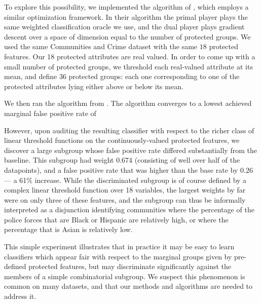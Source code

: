 To explore this possibility,
we implemented the algorithm of \cite{reductions}, which employs a
similar optimization framework. In their algorithm the primal player
plays the same weighted classification oracle we use, and the dual
player plays gradient descent over a space of dimension equal to the number of protected groups.
We used the same Communities and Crime dataset with the same $18$ protected features.
Our 18 protected attributes are real valued. In order to come up with a
small number of protected groups, we threshold each real-valued
attribute at its mean, and define 36 protected groups: each one corresponding
to one of the protected attributes lying either above or below its mean.

We then ran the algorithm from  \cite{reductions}.
The algorithm converges to a lowest achieved marginal false positive 
rate of

However, upon auditing the resulting classifier with respect to the richer
class of linear threshold functions on the continuously-valued
protected features, we discover a large subgroup whose false positive
rate differed substantially from the baseline. This subgroup had
weight $0.674$ (consisting of well over half of the datapoints),
and a false positive rate that was higher than the base rate by $0.26$ --- a 61\% increase.
While the discriminated subgroup is of course defined by a complex linear threshold function over 18 variables,
the largest weights by far were on only three of these features, and the subgroup can thus be informally
interpreted as a disjunction identifying communities where the percentage of the police forces
that are Black or Hispanic are relatively high, or where the percentage that is Asian is relatively low.

This simple experiment illustrates that in practice it may be easy
to learn classifiers which appear fair with respect to the
marginal groups given by pre-defined protected features, but may
discriminate significantly against the members of a simple combinatorial subgroup.
We suspect this phenomenon is common on many datasets, and that our methods and algorithms are needed
to address it.
\fi
